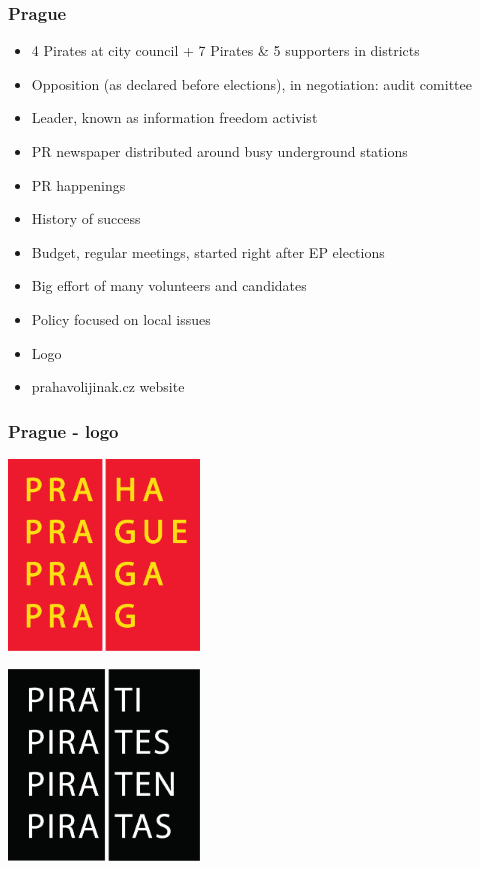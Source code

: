 \begin{frame}
	\frametitle{Prague}
	\begin{itemize}
		\item 4 Pirates at city council + 7 Pirates \& 5 supporters in districts
		\item Opposition (as declared before elections), in negotiation: audit comittee%
		\item Leader, known as information freedom activist
		\item PR newspaper distributed around busy underground stations
		\item PR happenings
		\item History of success
		\item Budget, regular meetings, started right after EP elections
		\item Big effort of many volunteers and candidates
		\item Policy focused on local issues
		\item Logo
		\item prahavolijinak.cz website
	\end{itemize}
\end{frame}
\begin{frame}
	\frametitle{Prague - logo}
	\begin{center}
	\begin{multicols}{2}
		\includegraphics[width = 0.38\textwidth]{Praha.eps}
		
		\includegraphics[width = 0.38\textwidth]{logo_pirati.eps}
	\end{multicols}
	\end{center}
\end{frame}
